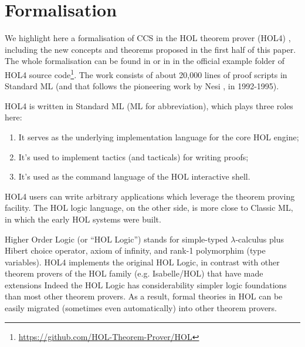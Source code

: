 \section{Formalisation}

We highlight here a formalisation of CCS
in the HOL theorem
prover (HOL4) \cite{slind2008brief},
including the new concepts and theorems proposed in the first half of
this paper.
The whole formalisation can be found 
in \cite{Tian:2017wrba}  or in 
 in the official example folder of HOL4 source
code\footnote{\url{https://github.com/HOL-Theorem-Prover/HOL}}. The
work consists of about 20,000 lines of proof scripts in Standard ML
(and that follows the pioneering work by Nesi \cite{Nesi:1992ve}, in
1992-1995). 

HOL4 is written in Standard ML (ML for abbreviation), which plays three roles here:
\begin{enumerate}
\item It serves as the underlying implementation language for the core HOL engine;
\item It's used to implement tactics (and tacticals) for writing proofs;
\item It's used as the command language of the HOL interactive shell.
\end{enumerate}
HOL4 users can write arbitrary applications which leverage
the theorem proving facility. 
\iflong
The HOL logic language, on the other
 side, is more close to Classic ML, in which the early HOL systems were built.
\fi

Higher Order Logic (or ``HOL Logic'') \cite{hollogic} stands for simple-typed $\lambda$-calculus plus Hibert
choice operator, axiom of infinity, and rank-1 polymorphim (type
variables). HOL4 implements the original HOL Logic, 
in contrast with 
 other theorem provers of the HOL family (e.g. Isabelle/HOL) that have
made extensions
Indeed the HOL Logic has considerability simpler logic
foundations than most other theorem provers. %
As a result,
formal theories in HOL can be easily migrated (sometimes even
automatically) into other theorem provers.


